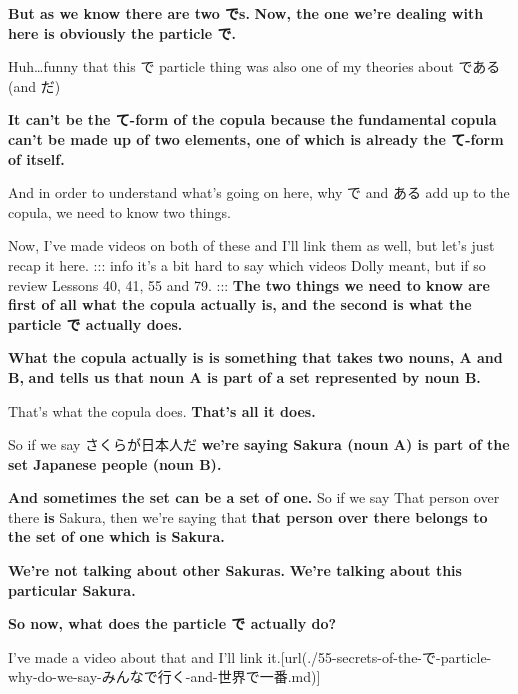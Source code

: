 {\bf But as we know there are two でs.} {\bf Now, the one we're dealing with here is obviously the particle で.}

Huh\ldots{}funny that this で particle thing was also one of my theories about である (and だ)

{\bf It can't be the て-form of the copula because the fundamental copula} {\bf can't be made up of two elements, one of which is already the て-form of itself.}

And in order to understand what's going on here, why で and ある add up to the copula, we need to know two things.

Now, I've made videos on both of these and I'll link them as well, but let's just recap it here. ::: info it's a bit hard to say which videos Dolly meant, but if so review Lessons 40, 41, 55 and 79. ::: {\bf The two things we need to know are first of all what the copula actually is,} {\bf and the second is what the particle で actually does.}

\startsectionlevel[title={What the copula actually is / does},reference={what-the-copula-actually-is-does}]

{\bf What the copula actually is is something that takes two nouns, A and B,} {\bf and tells us that noun A is part of a set represented by noun B.}

That's what the copula does. {\bf That's all it does.}

{}

So if we say さくらが日本人だ {\bf we're saying Sakura (noun A) is part of the set Japanese people (noun B).}

{\bf And sometimes the set can be a set of one.} So if we say That person over there {\bf is} Sakura, then we're saying that {\bf that person over there belongs to the set of one which is Sakura.}

{\bf We're not talking about other Sakuras.} {\bf We're talking about this particular Sakura.}

\thinrule

\stopsectionlevel

\startsectionlevel[title={What the particle で is / does},reference={what-the-particle-で-is-does}]

{\bf So now, what does the particle で actually do?}

I've made a video about that and I'll link it.\goto{{[}55{]}}[url(./55-secrets-of-the-で-particle-why-do-we-say-みんなで行く-and-世界で一番.md)]


